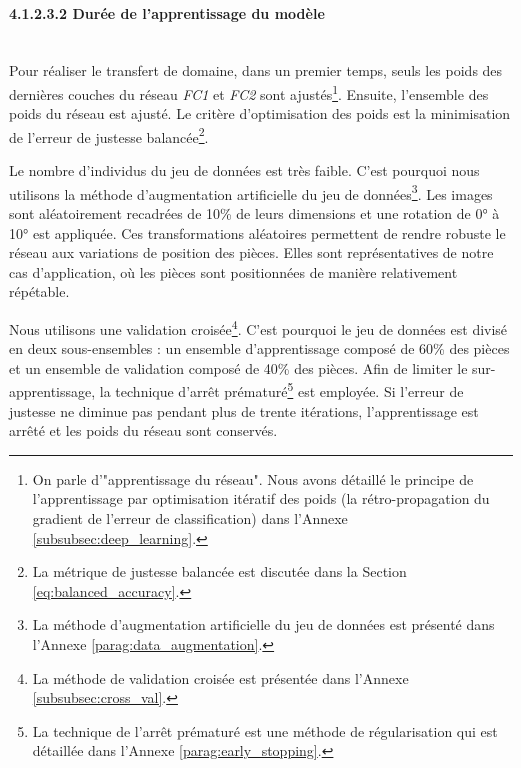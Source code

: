 
\paragraph{4.1.2.3.2 Durée de l'apprentissage du modèle} \mbox{} \\
Pour réaliser le transfert de domaine, dans un premier temps, seuls les poids des dernières couches du réseau \textit{FC1} et \textit{FC2} sont ajustés\footnote{On parle d'"apprentissage du réseau". Nous avons détaillé le principe de l'apprentissage par optimisation itératif des poids (la rétro-propagation du gradient de l'erreur de classification) dans l'Annexe \ref{subsubsec:deep_learning}.}.
Ensuite, l'ensemble des poids du réseau est ajusté.
Le critère d'optimisation des poids est la minimisation de l'erreur de justesse balancée\footnote{La métrique de justesse balancée est discutée dans la Section \ref{eq:balanced_accuracy}.}.

Le nombre d'individus du jeu de données est très faible.
C'est pourquoi nous utilisons la méthode d'augmentation artificielle du jeu de données\footnote{La méthode d'augmentation artificielle du jeu de données est présenté dans l'Annexe \ref{parag:data_augmentation}.}.
Les images sont aléatoirement recadrées de 10\% de leurs dimensions et une rotation de 0° à 10° est appliquée.
Ces transformations aléatoires permettent de rendre robuste le réseau aux variations de position des pièces.
Elles sont représentatives de notre cas d'application, où les pièces sont positionnées de manière relativement répétable.

Nous utilisons une validation croisée\footnote{La méthode de validation croisée est présentée dans l'Annexe \ref{subsubsec:cross_val}.}.
C'est pourquoi le jeu de données est divisé en deux sous-ensembles : un ensemble d'apprentissage composé de 60\% des pièces et un ensemble de validation composé de 40\% des pièces.
Afin de limiter le sur-apprentissage, la technique d'arrêt prématuré\footnote{La technique de l'arrêt prématuré est une méthode de régularisation qui est détaillée dans l'Annexe \ref{parag:early_stopping}.} est employée.
Si l'erreur de justesse ne diminue pas pendant plus de trente itérations, l'apprentissage est arrêté et les poids du réseau sont conservés.

